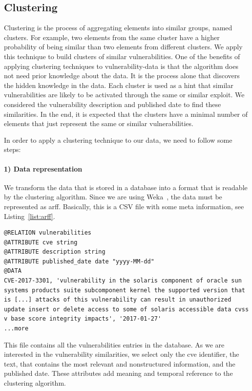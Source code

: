 \subsection*{Clustering}\label{sec:clustering}
Clustering is the process of aggregating elements into similar groups, named clusters. 
For example, two elements from the same cluster have a higher probability of being similar than two elements from different clusters. 
We apply this technique to build clusters of similar vulnerabilities.
One of the benefits of applying clustering techniques to vulnerability-data is that the algorithm does not need prior knowledge about the data.
It is the process alone that discovers the hidden knowledge in the data.
Each cluster is used as a hint that similar vulnerabilities are likely to be activated through the same or similar exploit.
We considered the vulnerability description and published date to find these similarities. 
In the end, it is expected that the clusters have a minimal number of elements that just represent the same or similar vulnerabilities.


In order to apply a clustering technique to our data, we need to follow some steps:

\paragraph{1) Data representation}
We transform the data that is stored in a database into a format that is readable by the clustering algorithm. 
Since we are using Weka~\cite{weka}, the data must be represented as \gls{arff}. 
Basically, this is a CSV file with some meta information, see Listing~\ref{list:arff}.

\begin{lstlisting}[style=mystyle,caption=ARFF file describing a vulnerability.,label=list:arff]
@RELATION vulnerabilities
@ATTRIBUTE cve string
@ATTRIBUTE description string
@ATTRIBUTE published_date date "yyyy-MM-dd"
@DATA
CVE-2017-3301, 'vulnerability in the solaris component of oracle sun systems products suite subcomponent kernel the supported version that is [...] attacks of this vulnerability can result in unauthorized update insert or delete access to some of solaris accessible data cvss v base score integrity impacts', '2017-01-27'
...more
\end{lstlisting}


This file contains all the vulnerabilities entries in the database. 
As we are interested in the vulnerability similarities, we select only the \gls{cve} identifier, the text, that contains the most relevant and nonstructured information, and the published date.
These attributes add meaning and temporal reference to the clustering algorithm.


